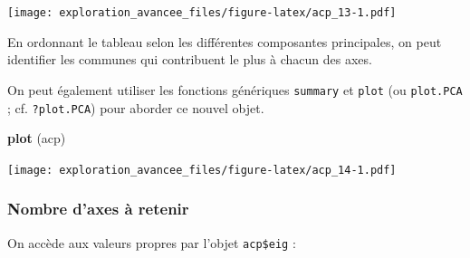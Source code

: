 \documentclass[]{book}
\newenvironment{Shaded}{\begin{snugshade}}{\end{snugshade}}
\newcommand{\DataTypeTok}[1]{\textcolor[rgb]{0.13,0.29,0.53}{#1}}
\newcommand{\DecValTok}[1]{\textcolor[rgb]{0.00,0.00,0.81}{#1}}
\newcommand{\FloatTok}[1]{\textcolor[rgb]{0.00,0.00,0.81}{#1}}
\newcommand{\KeywordTok}[1]{\textcolor[rgb]{0.13,0.29,0.53}{\textbf{#1}}}
\newcommand{\NormalTok}[1]{#1}
\newcommand{\OperatorTok}[1]{\textcolor[rgb]{0.81,0.36,0.00}{\textbf{#1}}}
\newcommand{\StringTok}[1]{\textcolor[rgb]{0.31,0.60,0.02}{#1}}
\begin{document}
\begin{Shaded}
\end{Shaded}

\texttt{[image: exploration\_avancee\_files/figure-latex/acp\_13-1.pdf]}

En ordonnant le tableau selon les différentes composantes principales, on peut identifier les communes qui contribuent le plus à chacun des axes.

On peut également utiliser les fonctions génériques \texttt{summary} et \texttt{plot} (ou \texttt{plot.PCA} ; cf. \texttt{?plot.PCA}) pour aborder ce nouvel objet.

\begin{Shaded}
\begin{Highlighting}[]
\KeywordTok{plot}\NormalTok{ (acp)}
\end{Highlighting}
\end{Shaded}

\texttt{[image: exploration\_avancee\_files/figure-latex/acp\_14-1.pdf]}

\hypertarget{nombre-daxes-a-retenir}{%
\subsubsection{Nombre d'axes à retenir}\label{nombre-daxes-a-retenir}}

On accède aux valeurs propres par l'objet \texttt{acp\$eig} :
\end{document}
